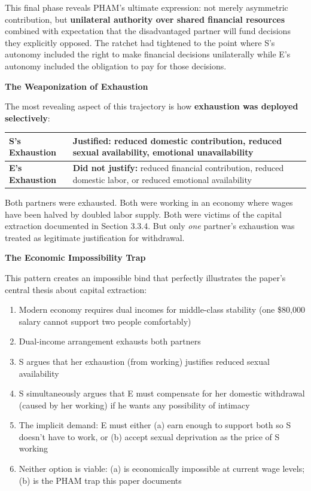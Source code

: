 \documentclass[12pt, letterpaper]{article}
\begin{document}
This final phase reveals PHAM's ultimate expression: not merely asymmetric contribution, but \textbf{unilateral authority over shared financial resources} combined with expectation that the disadvantaged partner will fund decisions they explicitly opposed. The ratchet had tightened to the point where S's autonomy included the right to make financial decisions unilaterally while E's autonomy included the obligation to pay for those decisions.

\textbf{The Weaponization of Exhaustion}

The most revealing aspect of this trajectory is how \textbf{exhaustion was deployed selectively}:

\begin{center}
\begin{tabular}{|p{2.2in}|p{3in}|}
\hline
\textbf{S's Exhaustion} & \textbf{Justified:} reduced domestic contribution, reduced sexual availability, emotional unavailability \\
\hline
\textbf{E's Exhaustion} & \textbf{Did not justify:} reduced financial contribution, reduced domestic labor, or reduced emotional availability \\
\hline
\end{tabular}
\end{center}

Both partners were exhausted. Both were working in an economy where wages have been halved by doubled labor supply. Both were victims of the capital extraction documented in Section 3.3.4. But only \textit{one} partner's exhaustion was treated as legitimate justification for withdrawal.

\textbf{The Economic Impossibility Trap}

This pattern creates an impossible bind that perfectly illustrates the paper's central thesis about capital extraction:

\begin{enumerate}
    \item Modern economy requires dual incomes for middle-class stability (one \$80,000 salary cannot support two people comfortably)
    \item Dual-income arrangement exhausts both partners
    \item S argues that her exhaustion (from working) justifies reduced sexual availability
    \item S simultaneously argues that E must compensate for her domestic withdrawal (caused by her working) if he wants any possibility of intimacy
    \item The implicit demand: E must either (a) earn enough to support both so S doesn't have to work, or (b) accept sexual deprivation as the price of S working
    \item Neither option is viable: (a) is economically impossible at current wage levels; (b) is the PHAM trap this paper documents
\end{enumerate}
\end{document}
